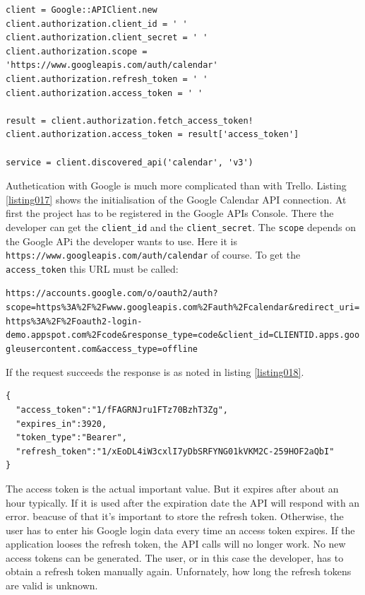 \begin{lstlisting}[aboveskip=1\baselineskip, caption=Initialisation of the Google Calendar API connection., label=listing017]
client = Google::APIClient.new
client.authorization.client_id = ' '
client.authorization.client_secret = ' '
client.authorization.scope = 'https://www.googleapis.com/auth/calendar'
client.authorization.refresh_token = ' '
client.authorization.access_token = ' '

result = client.authorization.fetch_access_token!
client.authorization.access_token = result['access_token']

service = client.discovered_api('calendar', 'v3')
\end{lstlisting}

Authetication with Google is much more complicated than with Trello. Listing \ref{listing017} shows the initialisation of the Google Calendar API connection. At first the project has to be registered in the Google APIs Console. \cite{google:apisconsole} There the developer can get the \lstinline{client_id} and the \lstinline{client_secret}. The \lstinline{scope} depends on the Google APi the developer wants to use. Here it is \texttt{https://www.googleapis.com/auth/calendar} of course. \cite{google:apiscope} To get the \lstinline{access_token} this URL must be called: 
\begin{center}
\lstinline{https://accounts.google.com/o/oauth2/auth?scope=https%3A%2F%2Fwww.googleapis.com%2Fauth%2Fcalendar&redirect_uri=https%3A%2F%2Foauth2-login-demo.appspot.com%2Fcode&response_type=code&client_id=CLIENTID.apps.googleusercontent.com&access_type=offline}
\end{center}

If the request succeeds the response is as noted in listing \ref{listing018}.

\begin{lstlisting}[aboveskip=1\baselineskip, caption=Response of the token request., label=listing018]
{
  "access_token":"1/fFAGRNJru1FTz70BzhT3Zg",
  "expires_in":3920,
  "token_type":"Bearer",
  "refresh_token":"1/xEoDL4iW3cxlI7yDbSRFYNG01kVKM2C-259HOF2aQbI"
}
\end{lstlisting}

The access token is the actual important value. But it expires after about an hour typically. If it is used after the expiration date the API will respond with an error. beacuse of that it's important to store the refresh token. Otherwise, the user has to enter his Google login data every time an access token expires. If the application looses the refresh token, the API calls will no longer work. No new access tokens can be generated. The user, or in this case the developer, has to obtain a refresh token manually again. \cite{google:calapi} Unfornately, how long the refresh tokens are valid is unknown.

